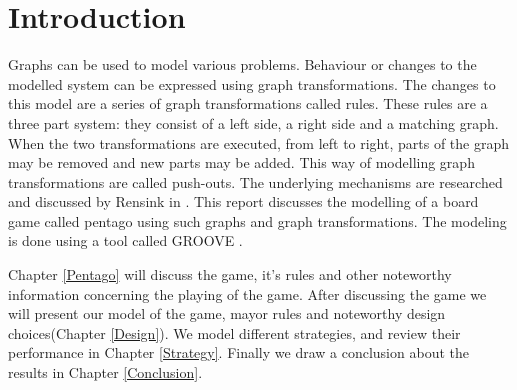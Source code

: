 \section{Introduction}
\label{Introduction}
Graphs can be used to model various problems.
Behaviour or changes to the modelled system can be expressed using graph transformations.
The changes to this model are a series of graph transformations called rules.
These rules are a three part system: they consist of a left side, a right side and a matching graph.
When the two transformations are executed, from left to right, parts of the graph may be removed and new parts may be added.
This way of modelling graph transformations are called push-outs.
The underlying mechanisms are researched and discussed by Rensink in \cite{Rensink2006}.
This report discusses the modelling of a board game called pentago using such graphs and graph transformations. 
The modeling is done using a tool called GROOVE \cite{tool-groove}.

\vspace{6pt}

Chapter \ref{Pentago} will discuss the game, it's rules and other noteworthy information concerning the playing of the game. 
After discussing the game we will present our model of the game, mayor rules and noteworthy design choices(Chapter \ref{Design}).
We model different strategies, and review their performance in Chapter \ref{Strategy}. Finally we draw a conclusion about the results in Chapter \ref{Conclusion}.